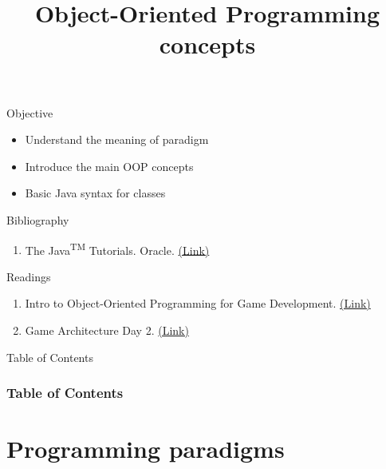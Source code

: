 \documentclass[10pt,compress]{beamer} %
\title[OOP concepts]{Object-Oriented Programming concepts}
\author{}
\institute{\asignatura}
\date{}
\begin{document}
{\titlepageBlue
    \begin{frame}
        \titlepage
    \end{frame}
}

\begin{frame}[plain]{}
   \begin{block}{Objective}
   \begin{itemize}
   		\item Understand the meaning of paradigm
   		\item Introduce the main OOP concepts
		\item Basic Java syntax for classes
	\end{itemize}
	\end{block}

   \begin{block}{Bibliography}
      \begin{enumerate}
          \item The Java\textsuperscript{TM} Tutorials. Oracle. \href{https://docs.oracle.com/javase/tutorial/}{(Link)}
      \end{enumerate} 
   \end{block}

   \begin{block}{Readings}
      \begin{enumerate}
          \item Intro to Object-Oriented Programming for Game Development. \href{https://gamedevelopment.tutsplus.com/tutorials/quick-tip-intro-to-object-oriented-programming-for-game-development--gamedev-1805}{(Link)}
          \item Game Architecture Day 2. \href{http://blog.nuclex-games.com/2010/01/game-architecture-day-2/}{(Link)}
      \end{enumerate} 
   \end{block}
\end{frame}

{
\eliminarNavegacion
\begin{frame}[shrink]{Table of Contents}
 \frametitle{Table of Contents}
 \tableofcontents
\end{frame}
}

\section[Programming paradigms]{Programming paradigms}
\end{document}
